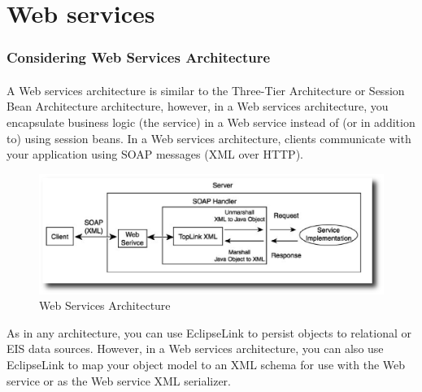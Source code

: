 \section{Web services}
\subsubsection{Considering Web Services Architecture}
\paragraph{}
A Web services architecture is similar to the Three-Tier Architecture or Session Bean Architecture architecture, however, in a Web services architecture, you encapsulate business logic (the service) in a Web service instead of (or in addition to) using session beans. In a Web services architecture, clients communicate with your application using SOAP messages (XML over HTTP). 

\begin{figure}
  \begin{center}
  \includegraphics[scale=0.6]{Figures/Web_Service_Arch.eps}
  \end{center}
  \caption{Web Services Architecture}
  \label{Web Services Architecture}
\end{figure}

As in any architecture, you can use EclipseLink to persist objects to relational or EIS data sources. However, in a Web services architecture, you can also use EclipseLink to map your object model to an XML schema for use with the Web service or as the Web service XML serializer. 